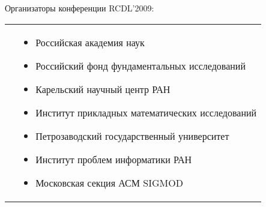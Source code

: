 \documentclass[10pt]{book}
\begin{document}
Организаторы конференции RCDL'2009:
\vspace*{-6pt}

\noindent
\begin{tabular}{p{7mm}p{420pt}}
\hspace*{7mm}&
\begin{itemize}
\item Российская академия наук
\item Российский фонд фундаментальных исследований
\item Карельский научный центр РАН
\item Институт прикладных математических исследований
\item Петрозаводский государственный университет
\item Институт проблем информатики РАН
\item Московская секция АСМ SIGMOD
\end{itemize}
\end{tabular}

\end{document}
